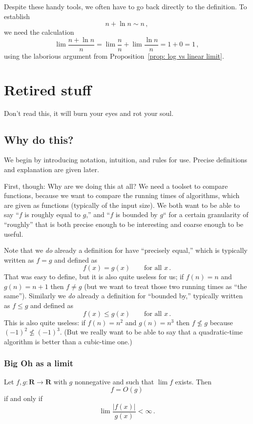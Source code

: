 \documentclass{tstextbook}
\begin{document}
Despite these handy tools, we often have to go back directly to the definition.
To establish 
\[n + \ln n \sim n\,,\]
we need the calculation
\[ \lim \frac{n+ \ln n}{n} = \lim\frac{n}{n} + \lim\frac{\ln n}{n} = 1 + 0= 1\,,\]
using the laborious argument from Proposition~\ref{prop: log vs linear limit}.


\chapter{Retired stuff}

Don't read this, it will burn your eyes and rot your soul.

\section{Why do this?}

We begin by introducing notation, intuition, and rules for use.
Precise definitions and explanation are given later.

First, though: Why are we doing this at all?
We need a toolset to compare functions, because we want to compare the running times of algorithms, which are given as functions (typically of the input size). 
We both want to be able to say ``$f$ is roughly equal to $g$,''  and ``$f$ is bounded by $g$`` for a certain granularity of ``roughly'' that is both precise enough to be interesting and coarse enough to be useful.

Note that we \emph{do} already a definition for have ``precisely equal,'' which is typically written as $f=g$ and defined as
\[ f(x) = g(x)\qquad\text{for all $x$}\,.\]
That was easy to define, but it is also quite useless for us; if $f(n) = n$ and $g(n)= n + 1$ then $f\neq g$ (but we want to treat those two running times as ``the same'').
Similarly we \emph{do} already a definition for ``bounded by,'' typically written as $f\leq g$ and defined as
\[ f(x) \leq g(x)\qquad\text{for all $x$}\,.\]
This is also quite useless: if $f(n) = n^2$ and $g(n)= n^3$ then $f\not\leq g$ because $(-1)^2 \not\leq (-1)^3$.
(But we really want to be able to say that a quadratic-time algorithm is better than a cubic-time one.)


\subsection{Big Oh as a limit}

\begin{theorem}
  Let $f,g\colon\mathbf R\rightarrow\mathbf R$ with $g$ nonnegative and such that $\lim f$ exists.
  Then \[ f=O(g) \]
 if and only if
  \[ \lim \frac{|f(x)|}{g(x)} < \infty \,.\]
\end{theorem}
\end{document}
